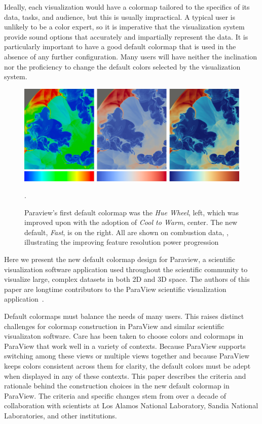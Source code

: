 \documentclass{IEEEcsmag}
\newcommand*{\colormap}[1]{\textsl{#1}\xspace}
\newcommand*{\huewheel}{\colormap{Hue Wheel}}
\newcommand*{\coolwarm}{\colormap{Cool to Warm}}
\newcommand*{\fast}{\colormap{Fast}}
\begin{document}
Ideally, each visualization would have a colormap tailored to the specifics of its data, tasks, and audience, but this is usually impractical.
A typical user is unlikely to be a color expert, so it is imperative that the visualization system provide sound options that accurately and impartially represent the data. It is particularly important to have a good default colormap that is used in the absence of any further configuration. Many users will have neither the inclination nor the proficiency to change the default colors selected by the visualization system.


\begin{figure}[htb]
\centering
\includegraphics[width=\textwidth]{Final_Pics/Larsen_the3.png}
\caption{Paraview's first default colormap was the \huewheel, left, which was improved upon with the adoption of \coolwarm, center. The new default, \fast, is on the right. All are shown on combustion data, \cite{Larsen}, illustrating the improving feature resolution power progression}.
\label{Larsen3}
\end{figure}

Here we present the new default colormap design for Paraview, a scientific visualization software application used throughout the scientific community to visualize large, complex datasets in both 2D and 3D space. The authors of this paper are longtime contributors to the ParaView scientific visualization application~\cite{Ahrens2005}.

Default colormaps must balance the needs of many users. This raises distinct challenges for colormap construction in ParaView and similar scientific visualizaton software.
Care has been taken to choose colors and colormaps in ParaView that work well in a variety of contexts.
Because ParaView supports switching among these views or multiple views together and because ParaView keeps colors consistent across them for clarity, the default colors must be adept when displayed in any of these contexts.
This paper describes the criteria and rationale behind the construction choices in the new default colormap in ParaView.
The criteria and specific changes stem from over a decade of collaboration with scientists at Los Alamos National Laboratory, Sandia National Laboratories, and other institutions.
\end{document}
